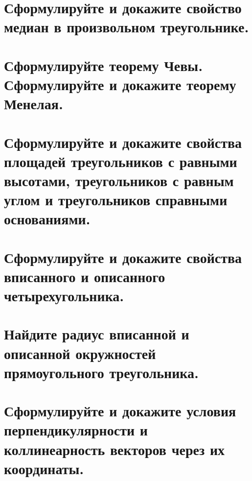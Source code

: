 \documentclass[12pt, letterpaper]{article}
\begin{document}
\section {Сформулируйте и докажите свойство медиан в произвольном треугольнике.}
\section {Сформулируйте теорему Чевы. Сформулируйте и докажите теорему Менелая.}
\section {Сформулируйте и докажите свойства площадей треугольников с равными высотами, треугольников с равным углом и треугольников справными основаниями.}
\section {Сформулируйте и докажите свойства вписанного и описанного четырехугольника.}
\section {Найдите радиус вписанной и описанной окружностей прямоугольного треугольника.}
\section {Сформулируйте и докажите условия перпендикулярности и коллинеарность векторов через их координаты.} 
\end{document}
